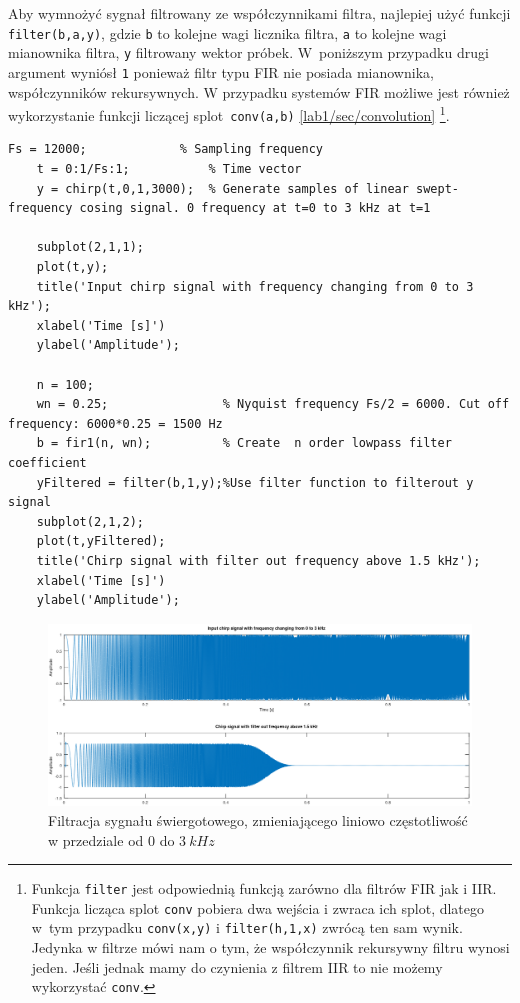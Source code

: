 Aby wymnożyć sygnał filtrowany ze współczynnikami filtra, najlepiej użyć funkcji \texttt{filter(b,a,y)}, gdzie \texttt{b} to kolejne wagi licznika filtra, \texttt{a} to kolejne wagi mianownika filtra, \texttt{y} filtrowany wektor próbek. W~poniższym przypadku drugi argument wyniósł \texttt{1} ponieważ filtr typu FIR nie posiada mianownika, współczynników rekursywnych. W przypadku systemów FIR możliwe jest również wykorzystanie funkcji liczącej splot~\texttt{conv(a,b)} \ref{lab1/sec/convolution} \footnote{Funkcja \texttt{filter} jest odpowiednią funkcją zarówno dla filtrów FIR jak i IIR. Funkcja licząca splot \texttt{conv} pobiera dwa wejścia i zwraca ich splot, dlatego w~tym przypadku \texttt{conv(x,y)} i \texttt{filter(h,1,x)} zwrócą ten sam wynik. Jedynka w filtrze mówi nam o tym, że współczynnik rekursywny filtru wynosi jeden. Jeśli jednak mamy do czynienia z filtrem IIR to nie możemy wykorzystać \texttt{conv}.}.




\begin{lstlisting}[caption=Filtracja sygnału świergotowego zmieniającego liniowo częstotliwość w przedziale od $0$ do $3~kHz$ , label=lab3/lst/chirpFilterOut]
	Fs = 12000;             % Sampling frequency
	t = 0:1/Fs:1;           % Time vector
	y = chirp(t,0,1,3000);  % Generate samples of linear swept-frequency cosing signal. 0 frequency at t=0 to 3 kHz at t=1
	
	subplot(2,1,1);
	plot(t,y);
	title('Input chirp signal with frequency changing from 0 to 3 kHz');
	xlabel('Time [s]')
	ylabel('Amplitude');
	
	n = 100;
	wn = 0.25;                % Nyquist frequency Fs/2 = 6000. Cut off frequency: 6000*0.25 = 1500 Hz
	b = fir1(n, wn);          % Create  n order lowpass filter coefficient
	yFiltered = filter(b,1,y);%Use filter function to filterout y signal
	subplot(2,1,2);
	plot(t,yFiltered);
	title('Chirp signal with filter out frequency above 1.5 kHz');
	xlabel('Time [s]')
	ylabel('Amplitude');
\end{lstlisting}

\begin{figure}[hbt!]
	\centering
	\includegraphics[width=0.9\linewidth]{images/chirpFilterOut.png}
	\caption{Filtracja sygnału świergotowego, zmieniającego liniowo częstotliwość w przedziale od $0$ do $3~kHz$}
	\label{lab3/fig/chirpFilterOut}
\end{figure}


